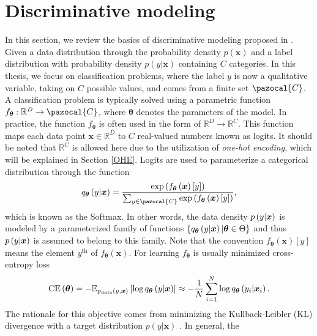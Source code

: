 \section{Discriminative modeling}
In this section, we review the basics of discriminative modeling proposed in \cite{HDGEmain}. Given a data distribution through the probability density $p(\boldsymbol{x})$ and a label distribution with probability density $p(y|\boldsymbol{x})$ containing $C$ categories. In this thesis, we focus on classification problems, where the label $y$ is now a qualitative variable, taking on $C$ possible values, and comes from a finite set $\pazocal{C}$.  A classification problem is typically solved using a parametric function $f_{\boldsymbol{\theta}} : \mathbb{R}^D \to \pazocal{C}$, where $\boldsymbol{\theta}$ denotes the parameters of the model. In practice, the function $f_{\boldsymbol{\theta}}$ is often used in the form of $\mathbb{R}^D \to  \mathbb{R}^C$. This function maps each data point $\boldsymbol{x} \in \mathbb{R}^D$ to $C$ real-valued numbers known as logits. It should be noted that $\mathbb{R}^C$ is allowed here due to the utilization of \emph{one-hot encoding}, which will be explained in Section \ref{OHE}. Logits are used to parameterize a categorical distribution through the function
\begin{equation}\label{softmax}
	q_{\boldsymbol{\theta}}\left(y|\boldsymbol{x}\right) = \frac{\exp\left({f_{\boldsymbol{\theta}}\left(\boldsymbol{x}\right)[y]}\right)}{\sum_{y\in\pazocal{C}}\exp\left({f_{\boldsymbol{\theta}}\left(\boldsymbol{x}\right)[y]}\right)},
\end{equation}
which is known as the Softmax. In other words, the data density $p\left(y\vert \boldsymbol{x}\right)$ is modeled by a parameterized family of functions $\left\lbrace q_{\boldsymbol{\theta}}\left(y\vert \boldsymbol{x}\right) \vert \boldsymbol{\theta} \in \Theta  \right\rbrace$ and thus $p\left(y\vert\boldsymbol{x}\right)$ is assumed to belong to this family.   Note that the convention $f_{\boldsymbol{\theta}}\left(\boldsymbol{x}\right)[y]$ means the element $y^{\mathrm{th}}$ of $f_{\boldsymbol{\theta}}\left(\boldsymbol{x}\right)$. For learning $f_{\boldsymbol{\theta}}$ is usually minimized cross-entropy loss 
\begin{equation}\label{crossentropy}
     \mathrm{CE}\left(\boldsymbol{\theta}\right)=-\mathbb{E}_{p_{\mathrm{data}}\left(y,\boldsymbol{x}\right)}\left[\log q_{\boldsymbol{\theta}}\left(y|\boldsymbol{x}\right)\right] \approx -\frac{1}{N}\sum_{i=1}^N\log q_{\boldsymbol{\theta}}\left(y_i|\boldsymbol{x}_i\right).
\end{equation} 
The rationale for this objective comes from minimizing the Kullback-Leibler (KL) divergence with a target distribution $p(y| \boldsymbol{x})$ \cite{KL}. In general, the
